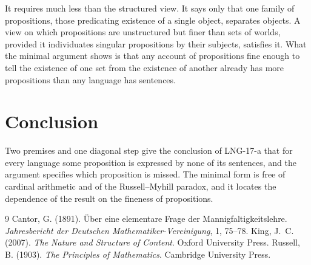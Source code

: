 \documentclass{situationist-preprint}
\begin{document}
\begin{reply}
It requires much less than the structured view. It says only that one family of propositions, those predicating existence of a single object, separates objects. A view on which propositions are unstructured but finer than sets of worlds, provided it individuates singular propositions by their subjects, satisfies it. What the minimal argument shows is that any account of propositions fine enough to tell the existence of one set from the existence of another already has more propositions than any language has sentences.
\end{reply}

\section{Conclusion}

Two premises and one diagonal step give the conclusion of LNG-17-a that for every language some proposition is expressed by none of its sentences, and the argument specifies which proposition is missed. The minimal form is free of cardinal arithmetic and of the Russell--Myhill paradox, and it locates the dependence of the result on the fineness of propositions.

\begin{thebibliography}{9}\small
{} Cantor, G. (1891). \"Uber eine elementare Frage der Mannigfaltigkeitslehre. \emph{Jahresbericht der Deutschen Mathematiker-Vereinigung}, 1, 75--78.
 King, J.~C. (2007). \emph{The Nature and Structure of Content}. Oxford University Press.
 Russell, B. (1903). \emph{The Principles of Mathematics}. Cambridge University Press.
\end{thebibliography}
\end{document}
